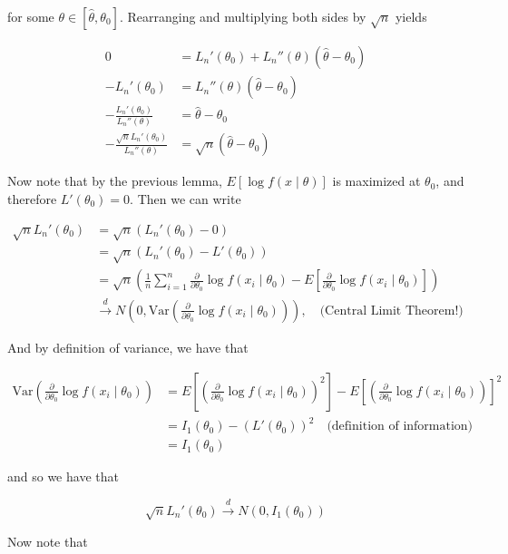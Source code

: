 \documentclass[
  letterpaper,
  DIV=11,
  numbers=noendperiod]{scrreprt}
\begin{document}
for some \(\theta \in [\hat{\theta}, \theta_0]\). Rearranging and
multiplying both sides by \(\sqrt{n}\) yields

\begin{align*}
    0 & = L_n'(\theta_0) + L_n''(\theta) (\hat{\theta} - \theta_0) \\
    - L_n'(\theta_0) & = L_n''(\theta) (\hat{\theta} - \theta_0) \\
    -\frac{L_n'(\theta_0)}{L_n''(\theta)} & = \hat{\theta} - \theta_0 \\
    -\frac{\sqrt{n}L_n'(\theta_0)}{L_n''(\theta)} & = \sqrt{n}(\hat{\theta} - \theta_0)
\end{align*}

Now note that by the previous lemma, \(E[\log f(x \mid \theta)]\) is
maximized at \(\theta_0\), and therefore \(L'(\theta_0) = 0\). Then we
can write

\begin{align*}
    \sqrt{n}L_n'(\theta_0) & = \sqrt{n}(L_n'(\theta_0) - 0) \\
    & = \sqrt{n} \left( L_n'(\theta_0) - L'(\theta_0)\right) \\
    & = \sqrt{n} \left( \frac{1}{n} \sum_{i = 1}^n \frac{\partial}{\partial \theta_0} \log f(x_i \mid \theta_0) - E\left[ \frac{\partial}{\partial \theta_0} \log f(x_i \mid \theta_0)\right] \right) \\
    & \overset{d}{\to} N \left( 0, \text{Var}\left( \frac{\partial}{\partial \theta_0} \log f(x_i \mid \theta_0) \right) \right), \quad \text{(Central Limit Theorem!)}
\end{align*}

And by definition of variance, we have that

\begin{align*}
    \text{Var}\left( \frac{\partial}{\partial \theta_0} \log f(x_i \mid \theta_0) \right) & = E \left[ \left( \frac{\partial}{\partial \theta_0} \log f(x_i \mid \theta_0) \right)^2 \right] - E \left[ \left( \frac{\partial}{\partial \theta_0} \log f(x_i \mid \theta_0) \right)\right]^2 \\
    & = I_1(\theta_0) - (L'(\theta_0))^2 \quad \text{(definition of information)} \\
    & = I_1(\theta_0)
\end{align*}

and so we have that

\[
\sqrt{n} L_n'(\theta_0) \overset{d}{\to} N(0, I_1(\theta_0))
\]

Now note that
\end{document}
